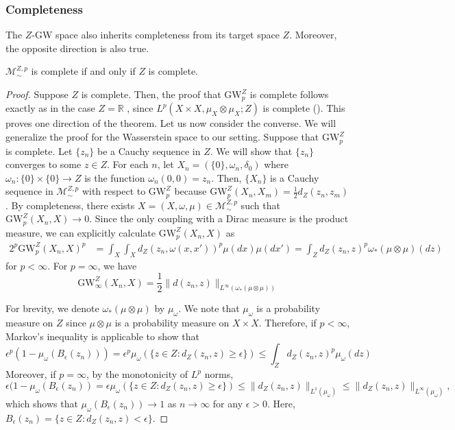 \documentclass[twoside,11pt]{article}
\theoremstyle{definition}
\newcommand{\M}{\mathcal{M}}
\newcommand{\MZp}{\M_{\sim}^{Z,p}}
\newcommand{\dgwz}{\mathrm{GW}_p^Z}
\newcommand{\dgwinf}{\mathrm{GW}_{\infty}^Z}
\begin{document}
\subsubsection{Completeness}
The $Z$-GW space also inherits completeness from its target space $Z$. Moreover, the opposite direction is also true.

\begin{theorem}\label{thm:complete}
    $\MZp$ is complete if and only if $Z$ is complete.
\end{theorem}
\begin{proof}
    Suppose $Z$ is complete. Then, the proof that $\dgwz$ is complete follows exactly as in the case $Z=\mathbb{R}$ \citep[Theorem 5.8]{sturm2023space}, since $L^p(X\times X, \mu_X \otimes \mu_X; Z)$ is complete (). This proves one direction of the theorem.
    Let us now consider the converse. We will generalize the proof for the Wasserstein space \citep{pinelis_complete} to our setting. Suppose that $\dgwz$ is complete. Let $\{z_n\}$ be a Cauchy sequence in $Z$. We will show that $\{z_n\}$ converges to some $z\in Z$. For each $n$, let $X_n = (\{0\}, \omega_n, \delta_{0})$ where $\omega_n:\{0\}\times \{0\}\to Z$ is the function $\omega_n(0,0)=z_n$. Then, $\{X_n\}$ is a Cauchy sequence in $\MZp$ with respect to $\dgwz$ because $\dgwz(X_n, X_m)=\frac{1}{2}d_Z(z_n,z_m)$. By completeness, there exists $X=(X,\omega,\mu)\in \MZp$ such that $\dgwz(X_n,X)\to 0$. Since the only coupling with a Dirac measure is the product measure, we can explicitly calculate $\dgwz(X_n,X)$ as
    \begin{align}
        2^p\dgwz(X_n,X)^p & = \int_{X}\int_{X}d_Z(z_n,\omega(x,x'))^p\mu(dx)\mu(dx')  =\int_{Z}d_Z(z_n,z)^p\omega_*(\mu \otimes \mu)(dz)
    \end{align}
    for $p<\infty$. For $p=\infty$, we have 
    \begin{equation}
        \dgwinf(X_n, X) = \frac{1}{2}\|d(z_n, z)\|_{L^{\infty}(\omega_*(\mu\otimes\mu))}
    \end{equation}
    
    For brevity, we denote $\omega_\ast(\mu\otimes \mu)$ by $\mu_{\omega}$. We note that $\mu_{\omega}$ is a probability measure on $Z$ since $\mu\otimes \mu$ is a probability measure on $X\times X$. Therefore, if $p<\infty$, Markov's inequality is applicable to show that
    \begin{equation}
        \epsilon^p(1-\mu_{\omega}(B_{\epsilon}(z_n))) = \epsilon^p \mu_{\omega}(\{z\in Z: d_Z(z_n,z)\geq \epsilon\}) \leq \int_{Z}d_Z(z_n,z)^p\mu_{\omega}(dz)
    \end{equation}
    Moreover, if $p=\infty$, by the monotonicity of $L^p$ norms,
    \begin{equation}
        \epsilon(1-\mu_{\omega}(B_{\epsilon}(z_n)) = \epsilon\mu_{\omega}(\{z\in Z: d_Z(z_n,z)\geq \epsilon\}) \leq \|d_Z(z_n,z)\|_{L^1(\mu_\omega)} \leq \|d_Z(z_n,z)\|_{L^{\infty}(\mu_\omega)},
    \end{equation}
    which shows that $\mu_{\omega}(B_{\epsilon}(z_n))\to 1$ as $n\to \infty$ for any $\epsilon>0$. Here, $B_{\epsilon}(z_n)=\{z\in Z :d_Z(z_n,z)<\epsilon\}$. 
    

\end{proof}
\end{document}
